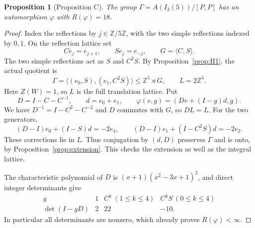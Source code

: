 \documentclass[11pt]{article}
\newtheorem{proposition}[theorem]{Proposition}
\theoremstyle{definition}
\newcommand{\Z}{\mathbb{Z}}
\begin{document}
\begin{proposition}[Proposition C]\label{prop:dihedral-counterexample}
The group $\Gamma=A(I_2(5))/[P,P]$ has an automorphism $\varphi$ with $R(\varphi)=18$.
\end{proposition}
\begin{proof}
Index the reflections by $j\in\Z/5\Z$, with the two simple reflections indexed by $0,1$.
On the reflection lattice set
\[
 Ce_j=e_{j+1},\qquad Se_j=e_{-j},\qquad G=\langle C,S\rangle.
\]
The two simple reflections act as $S$ and $C^2S$. By Proposition~\ref{prop:H1}, the actual quotient is
\[
 \Gamma=\langle(e_0,S),(e_1,C^2S)\rangle\le\Z^5\rtimes G,
 \qquad L=2\Z^5.
\]
Here $Z(W)=1$, so $L$ is the full translation lattice. Put
\[
 D=I-C-C^{-1},\qquad d=e_0+e_1,\qquad
 \varphi(v,g)=(Dv+(I-g)d,g).
\]
We have $D^{-1}=I-C^2-C^{-2}$ and $D$ commutes with $G$, so $DL=L$. For the two generators,
\[
 (D-I)e_0+(I-S)d=-2e_4,\qquad
 (D-I)e_1+(I-C^2S)d=-2e_2.
\]
These corrections lie in $L$. Thus conjugation by $(d,D)$ preserves $\Gamma$ and is onto, by
Proposition~\ref{prop:extension}. This checks the extension as well as the integral lattice.

The characteristic polynomial of $D$ is $(x+1)(x^2-3x+1)^2$, and direct integer determinants give
\[
\begin{array}{c|ccc}
 g&1&C^k\ (1\le k\le4)&C^kS\ (0\le k\le4)\\ \hline
 \det(I-gD)&2&22&-10.
\end{array}
\]
In particular all determinants are nonzero, which already proves $R(\varphi)<\infty$.


\end{proof}
\end{document}
